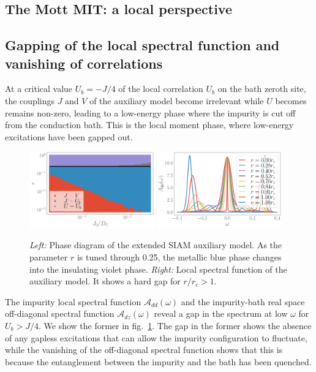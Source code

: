 \documentclass[reprint,hidelinks]{revtex4-2}
\begin{document}
\begin{widetext}

\section{The Mott MIT: a local perspective}
\subsection{Gapping of the local spectral function and vanishing of correlations}
At a critical value \(U_b = -J/4\) of the local correlation \(U_b\) on the bath zeroth site, the couplings \(J\) and \(V\) of the auxiliary model become irrelevant while \(U\) becomes remains non-zero, leading to a low-energy phase where the impurity is cut off from the conduction bath. This is the local moment phase, where low-energy excitations have been gapped out.
\begin{figure}[htpb]
	\centering
	\includegraphics[width=0.48\textwidth]{phase-map-MIT.pdf}
	\includegraphics[width=0.48\textwidth]{spectral-function_dd.pdf}
	\caption{{\it Left:} Phase diagram of the extended SIAM auxiliary model. As the parameter \(r\) is tuned through 0.25, the metallic blue phase changes into the insulating violet phase. {\it Right:} Local spectral function of the auxiliary model. It shows a hard gap for \(r/r_c > 1\).}
	\label{spec_func_mit}
\end{figure}

The impurity local spectral function \(\mathcal{A}_{dd}(\omega)\) and the impurity-bath real space off-diagonal spectral function \(\mathcal{A}_{dz}(\omega)\) reveal a gap in the spectrum at low \(\omega\) for \(U_b > J/4\). We show the former in fig.~\ref{spec_func_mit}. The gap in the former shows the absence of any gapless excitations that can allow the impurity configuration to fluctuate, while the vanishing of the off-diagonal spectral function shows that this is because the entanglement between the impurity and the bath has been quenched. 


\end{widetext}
\end{document}
